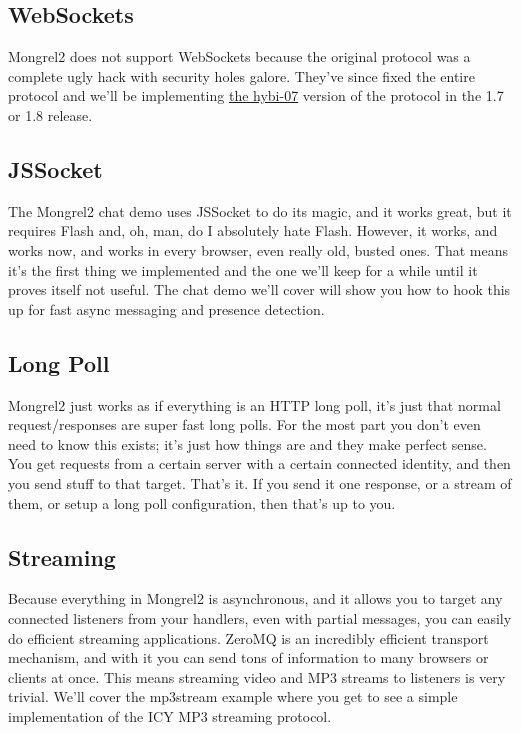 \subsection{WebSockets}

Mongrel2 does not support WebSockets because the original protocol was a complete
ugly hack with security holes galore.  They've since fixed the entire protocol
and we'll be implementing \href{http://tools.ietf.org/html/draft-ietf-hybi-thewebsocketprotocol-07}{the hybi-07}
version of the protocol in the 1.7 or 1.8 release.


\subsection{JSSocket}

The Mongrel2 chat demo uses JSSocket to do its magic, and it works great, but it requires
Flash and, oh, man, do I absolutely hate Flash.  However, it works, and works now, and works in every
browser, even really old, busted ones.  That means it's the first thing we implemented and
the one we'll keep for a while until it proves itself not useful.  The chat demo we'll
cover will show you how to hook this up for fast async messaging and presence detection.


\subsection{Long Poll}

Mongrel2 just works as if everything is an HTTP long poll, it's just that normal request/responses
are super fast long polls.  For the most part you don't even need to know this exists; it's just
how things are and they make perfect sense.  You get requests from a certain server with a
certain connected identity, and then you send stuff to that target.  That's it.  If you send it
one response, or a stream of them, or setup a long poll configuration, then that's up to you.


\subsection{Streaming}

Because everything in Mongrel2 is asynchronous, and it allows you to target any connected listeners
from your handlers, even with partial messages, you can easily do efficient streaming applications.  ZeroMQ
is an incredibly efficient transport mechanism, and with it you can send tons of information to many
browsers or clients at once.  This means streaming video and MP3 streams to listeners is very
trivial.  We'll cover the mp3stream example where you get to see a simple implementation of the ICY
MP3 streaming protocol.

